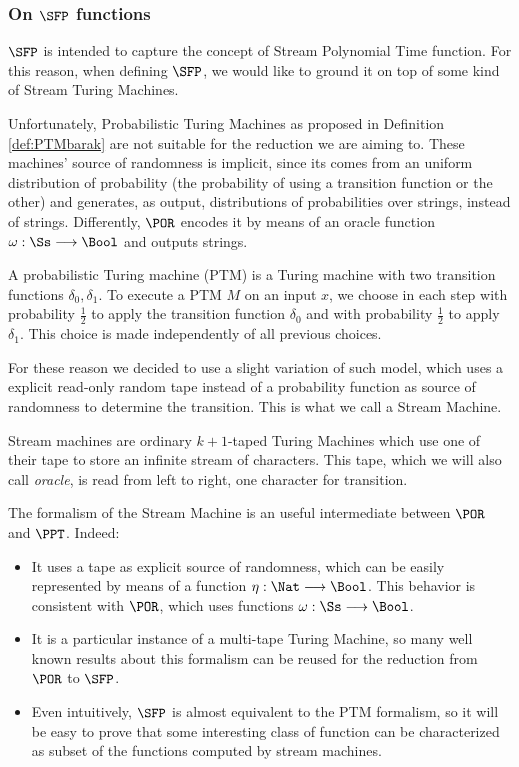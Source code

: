 \subsubsection{On $\SFP$ functions}
\label{subsec:SFP}
\begin{conditional}{\notappendix}

  $\SFP$ is intended to capture the concept
  of Stream Polynomial Time function. For this reason, when defining
  $\SFP$, we would like to ground it on top of some kind of Stream Turing Machines.

  Unfortunately, Probabilistic Turing Machines
  as proposed in Definition \ref{def:PTMbarak} are not
  suitable for the reduction we are aiming to. These machines' source of randomness
  is implicit,
  since its comes from an uniform distribution of probability
  (the probability of using a transition function or the other)
  and generates, as output, distributions of probabilities over strings, instead
  of strings. Differently, $\POR$ encodes it by means of an oracle function
  $\omega : \Ss \longrightarrow \Bool$ and outputs strings.

  \begin{defn}
    \label{def:PTMbarak}
    A probabilistic Turing machine (PTM) is a Turing machine with two
    transition functions $\delta_0, \delta_1$. To execute a PTM $M$
    on an input $x$, we choose in each step with probability $\frac 1 2$
    to apply the transition function $\delta_0$ and with probability $\frac 1 2$
    to apply $\delta_1$. This choice is made independently of all previous choices.
  \end{defn}

  For these reason we decided to use a slight variation of such model, which
  uses a explicit read-only random tape instead of a probability function as
  source of randomness to determine the transition.
  This is what we call a Stream Machine.

  Stream machines are ordinary $k+1$-taped Turing Machines which use one of
  their tape to store an infinite stream of characters. This tape, which we will
  also call \emph{oracle}, is read from left to right, one character for transition.

  The formalism of the Stream Machine is an useful intermediate between $\POR$
  and $\PPT$. Indeed:
  \begin{itemize}
    \item It uses a tape as explicit source of randomness, which can
    be easily represented by means of a function $\eta: \Nat \longrightarrow \Bool$.
    This behavior is consistent with $\POR$, which uses functions
    $\omega: \Ss \longrightarrow \Bool$.
    \item It is a particular instance of a multi-tape Turing Machine, so many well
    known results about this formalism can be reused for the reduction from
    $\POR$ to $\SFP$.
    \item Even intuitively, $\SFP$ is almost equivalent to the PTM formalism, so it will
    be easy to prove that some interesting class of function can be characterized
    as subset of the functions computed by stream machines.
  \end{itemize}


\end{conditional}

